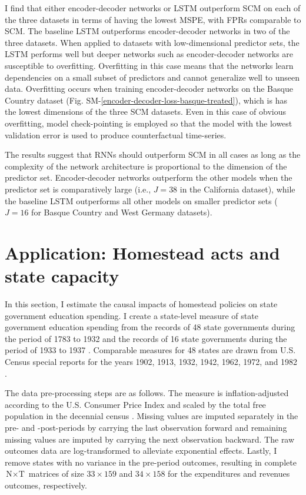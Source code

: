 \documentclass[hidelinks,12pt]{article}
\begin{document}
I find that either encoder-decoder networks or LSTM outperform SCM on each of the three datasets in terms of having the lowest MSPE, with FPRs comparable to SCM. The baseline LSTM outperforms encoder-decoder networks in two of the three datasets. When applied to datasets with low-dimensional predictor sets, the LSTM performs well but deeper networks such as encoder-decoder networks are susceptible to overfitting. Overfitting in this case means that the networks learn dependencies on a small subset of predictors and cannot generalize well to unseen data. Overfitting occurs when training encoder-decoder networks on the Basque Country dataset (Fig. SM-\ref{encoder-decoder-loss-basque-treated}), which is has the lowest dimensions of the three SCM datasets. Even in this case of obvious overfitting, model check-pointing is employed so that the model with the lowest validation error is used to produce counterfactual time-series.

The results suggest that RNNs should outperform SCM in all cases as long as the complexity of the network architecture is proportional to the dimension of the predictor set. Encoder-decoder networks outperform the other models when the predictor set is comparatively large (i.e., $J=38$ in the California dataset), while the baseline LSTM outperforms all other models on smaller predictor sets ($J=16$ for Basque Country and West Germany datasets). 

\section{Application: Homestead acts and state capacity} \label{state-capacity}

In this section, I estimate the causal impacts of homestead policies on state government education spending. I create a state-level measure of state government education spending from the records of 48 state governments during the period of 1783 to 1932 \citep{sylla1993sources} and the records of 16 state governments during the period of 1933 to 1937 \citep{sylla1995sourcesa,sylla1995sourcesb}. Comparable measures for 48 states are drawn from U.S. Census special reports for the years 1902, 1913, 1932, 1942, 1962, 1972, and 1982 \citep{haines2010}.

The data pre-processing steps are as follows. The measure is inflation-adjusted according to the U.S. Consumer Price Index \citep{williamson2017seven} and scaled by the total free population in the decennial census \citep{haines2010}. Missing values are imputed separately in the pre- and -post-periods by carrying the last observation forward and remaining missing values are imputed by carrying the next observation backward. The raw outcomes data are log-transformed to alleviate exponential effects. Lastly, I remove states with no variance in the pre-period outcomes, resulting in complete $\text{N} \times \text{T}$ matrices of size $33 \times 159$ and $34 \times 158$ for the expenditures and revenues outcomes, respectively. 
\end{document}
